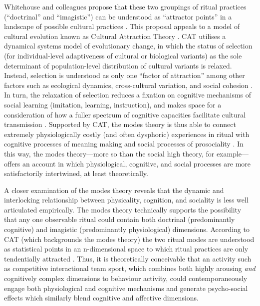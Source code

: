 \begin{CJK}{UTF8}{gbsn}
Whitehouse and colleagues propose that these two groupings of ritual practices (``doctrinal'' and ``imagistic'') can be understood as ``attractor points'' in a landscape of possible cultural practices \citep{Atkinson2011,Whitehouse2014}.  This proposal appeals to a model of cultural evolution known as Cultural Attraction Theory \citep[hereafter CAT; an extension of Sperber's ``epidemiology of representations,'' see][]{Sperber1996,Claidiere2007,Claidiere2014}.  CAT utilises a dynamical systems model of evolutionary change, in which the status of selection (for individual-level adaptiveness of cultural or biological variants) as the sole determinant of population-level distribution of cultural variants is relaxed.  Instead, selection is understood as only one ``factor of attraction'' among other factors such as ecological dynamics, cross-cultural variation, and social cohesion \citep{Henrich2014,Claidiere2014,Heyes2011}. In turn, the relaxation of selection reduces a fixation on cognitive mechanisms of social learning (imitation, learning, instruction), and makes space for a consideration of how a fuller spectrum of cognitive capacities facilitate cultural transmission \citep{Acerbi2015}.  Supported by CAT, the modes theory is thus able to connect extremely physiologically costly (and often dysphoric) experiences in ritual with cognitive processes of meaning making and social processes of prosociality \citep[including extreme levels of pro-group sacrifice ][]{Whitehouse2014,Whitehouse2017}.  In this way, the modes theory---more so than the social high theory, for example---offers an account in which physiological, cognitive, and social processes are more satisfactorily intertwined, at least theoretically.

A closer examination of the modes theory reveals that the dynamic and interlocking relationship between physicality, cognition, and sociality is less well articulated empirically.  The modes theory technically supports the possibility that any one observable ritual could contain both doctrinal (predominantly cognitive) and imagistic (predominantly physiological) dimensions.  According to CAT (which backgrounds the modes theory) the two ritual modes are understood as statistical points in an n-dimensional space to which ritual practices are only tendentially attracted \citep{Atkinson2011,Whitehouse2014a,Scott-Phillips2017}.  Thus, it is theoretically conceivable that an activity such as competitive interactional team sport, which combines both highly arousing \textit{and} cognitively complex dimensions to behaviour activity,  could contemporaneously engage both physiological and cognitive mechanisms and generate psycho-social effects which similarly blend cognitive and affective dimensions.


\end{CJK}
